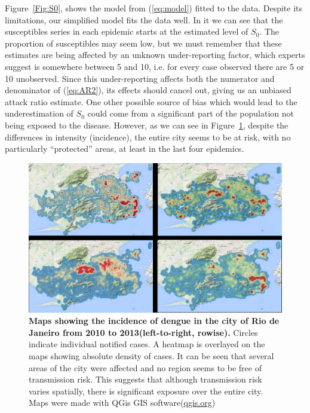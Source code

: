 \documentclass[10pt]{article}
\begin{document}
Figure~\ref{Fig:S0}, shows the model from (\ref{eq:model}) fitted to the data.
Despite its limitations, our simplified model fits the data well.
In it we can see that the susceptibles series in each epidemic starts at the 
estimated level of $S_0$.
The proportion of susceptibles may seem low, but we 
must remember that these estimates are being affected by an unknown 
under-reporting factor, which experts suggest is somewhere between 5 and 10, 
i.e. for every case observed there are 5 or 10 unobserved.
Since this under-reporting affects both the numerator and denominator of 
(\ref{eq:AR2}), its effects should cancel out, giving us an unbiased attack 
ratio estimate.
One other possible source of bias which would lead to the underestimation of 
$S_0$ could come from a significant part of the population not being exposed to 
the disease.
However, as we can see in Figure~\ref{fig:mapas}, despite the differences in 
intensity (incidence), the entire city seems to be at risk, with no 
particularly ``protected'' areas, at least in the last four epidemics. 

\begin{center}
\begin{figure}
\includegraphics[width=\textwidth]{./plots/figure-2-coelho.jpg}

  \caption{{\bf Maps showing the incidence of dengue in the city of Rio de 
Janeiro from 2010 to 2013(left-to-right, rowise).} Circles indicate individual 
notified cases. A 
heatmap is overlayed on the maps showing absolute density of cases.
It can be seen that several areas of the city were affected and no region seems 
to be free of transmission risk.
This suggests that although transmission risk varies spatially, there is 
significant exposure over the entire city. Maps were made with QGis GIS 
software(\url{qgis.org})}
  \label{fig:mapas}
\end{figure}
\end{center}
\end{document}
